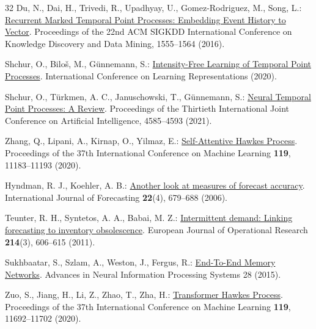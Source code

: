 \documentclass[runningheads]{llncs}
\begin{document}
\begin{thebibliography}{32}
Du, N., Dai, H., Trivedi, R., Upadhyay, U., Gomez-Rodriguez, M., Song, L.: \href{https://www.kdd.org/kdd2016/papers/files/rpp1081-duA.pdf}{Recurrent Marked Temporal Point Processes: Embedding Event History to Vector}. Proceedings of the 22nd ACM SIGKDD International Conference on Knowledge Discovery and Data Mining, 1555--1564 (2016). 

Shchur, O., Bilo\v{s}, M., G\"{u}nnemann, S.: \href{https://openreview.net/forum?id=HygOjhEYDH}{Intensity-Free Learning of Temporal Point Processes}. International Conference on Learning Representations (2020).

Shchur, O., T\"{u}rkmen, A. C., Januschowski, T., G\"{u}nnemann, S.: \href{https://www.ijcai.org/proceedings/2021/623}{Neural Temporal Point Processes: A Review}. Proceedings of the Thirtieth International Joint Conference on Artificial Intelligence, 4585--4593 (2021). 

Zhang, Q., Lipani, A., Kirnap, O., Yilmaz, E.: \href{https://proceedings.mlr.press/v119/zhang20q.html}{Self-Attentive Hawkes Process}. Proceedings of the 37th International Conference on Machine Learning \textbf{119}, 11183--11193 (2020).

Hyndman, R. J., Koehler, A. B.: \href{https://doi.org/10.1016/j.ijforecast.2006.03.001}{Another look at measures of forecast accuracy}. International Journal of Forecasting \textbf{22}(4), 679--688 (2006). 

Teunter, R. H., Syntetos, A. A., Babai, M. Z.: \href{https://www.sciencedirect.com/science/article/pii/S0377221711004437}{Intermittent demand: Linking forecasting to inventory obsolescence}. European Journal of Operational Research \textbf{214}(3), 606--615 (2011). 

Sukhbaatar, S., Szlam, A., Weston, J., Fergus, R.: \href{https://proceedings.neurips.cc/paper/2015/hash/8fb21ee7a2207526da55a679f0332de2-Abstract.html}{End-To-End Memory Networks}. Advances in Neural Information Processing Systems 28 (2015).

Zuo, S., Jiang, H., Li, Z., Zhao, T., Zha, H.: \href{https://proceedings.mlr.press/v119/zuo20a.html}{Transformer Hawkes Process}. Proceedings of the 37th International Conference on Machine Learning \textbf{119}, 11692--11702 (2020).


\end{thebibliography}
\end{document}
